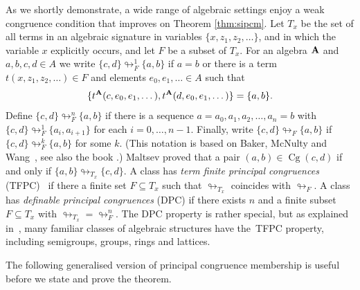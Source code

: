 \documentclass[reqno]{amsart}
\theoremstyle{plain}
\theoremstyle{definition}
\newcommand{\collapse}{\looparrowright}
\newcommand{\Cg}{\operatorname{Cg}}
\begin{document}
As we shortly demonstrate, a wide range of algebraic settings enjoy a weak congruence condition that improves on Theorem \ref{thm:sipcm}.  Let $T_x$ be the set of all terms in an algebraic signature in variables $\{x,z_1,z_2,\dots\}$, and in which the variable $x$ explicitly occurs, and let $F$ be a subset of $T_x$.  For an algebra ${\bf A}$ and $a,b,c,d\in A$ we write $\{c,d\}\collapse^1_F\{a,b\}$ if $a=b$ or there is a term $t(x,z_1,z_2,\dots) \in F$ and elements $e_0,e_1,\dots\in A$ such that 
\[
\{t^{\bf A}(c,e_0,e_1,\dots),t^{\bf A}(d,e_0,e_1,\dots)\}=\{a,b\}.
\]  
Define  $\{c,d\}\collapse^{n}_F\{a,b\}$ if there is a sequence $a=a_0,a_1,a_2,\dots,a_n=b$ with $\{c,d\}\collapse_F^1\{a_i,a_{i+1}\}$ for each $i=0,\dots,n-1$.  Finally, write $\{c,d\}\collapse_F\{a,b\}$ if $\{c,d\}\collapse_F^k\{a,b\}$ for some $k$.  
(This notation is based on Baker, McNulty and Wang~\cite{BMW}, see also the book \cite[p.~25]{ALV}.)  Maltsev proved that a pair $(a,b)\in \Cg(c,d)$ if and only if $\{a,b\}\collapse_{T_x}\{c,d\}$.  
A class has \emph{term finite principal congruences} (TFPC)~\cite{CDFJ}  if there a finite set $F\subseteq T_x$ such that $\collapse_{T_x}$ coincides with $\collapse_{F}$.  A class has \emph{definable principal congruences} (DPC) if there exists $n$ and a finite subset $F\subseteq T_x$ with ${\collapse_{T_x}}={\collapse_F^n}$.  
The DPC property is rather special, but as explained in~\cite{CDFJ}, many familiar classes of algebraic structures have the~TFPC property, including semigroups, groups, rings and lattices.  

The following generalised version of \textsf{principal congruence membership} is useful before we state and prove the theorem.

\medskip
\end{document}
